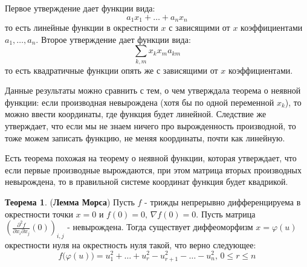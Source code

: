 \documentclass[12pt]{article}
\theoremstyle{definition}
\newtheorem{theorem}{Теорема}
\begin{document}
Первое утверждение дает функции вида: 
$$
	a_1x_1 + \dotsc + a_n x_n
$$ 
то есть линейные функции в окрестности $x$ с зависящими от $x$ коэффициентами $a_1,\dotsc, a_n$. Второе утверждение дает функции вида:
$$
	\displaystyle \sum\limits_{k,m}x_k x_m a_{km}
$$ 
то есть квадратичные функции опять же с зависящими от $x$ коэффициентами. 

Данные результаты можно сравнить с тем, о чем утверждала теорема о неявной функции: если производная невырождена (хотя бы по одной переменной $x_k$), то можно ввести координаты, где функция будет линейной. Следствие же утверждает, что если мы не знаем ничего про вырожденность производной, то тоже можем записать функцию, не меняя координаты, почти как линейную.

Есть теорема похожая на теорему о неявной функции, которая утверждает, что если первые производные вырождаются, при этом матрица вторых производных невырождена, то в правильной системе координат функция будет квадрикой.
\begin{theorem}(\textbf{Лемма Морса})
	Пусть $f$ - трижды непрерывно дифференцируема в окрестности точки $x = 0$ и $f(0) = 0, \, \nabla f(0) = 0$. Пусть матрица $\left(\tfrac{\partial^2 f}{\partial x_i \partial x_j}(0)\right)_{i,j}$ - невырождена. Тогда существует диффеоморфизм $x = \varphi(u)$ окрестности нуля на окрестность нуля такой, что верно следующее:
	$$
		f\big(\varphi(u) \big) = u_1^2 + \dotsc + u_r^2	- u_{r+1}^2 - \dotsc -u_n^2, \, 0 \leq r \leq n
	$$
\end{theorem}
\end{document}
